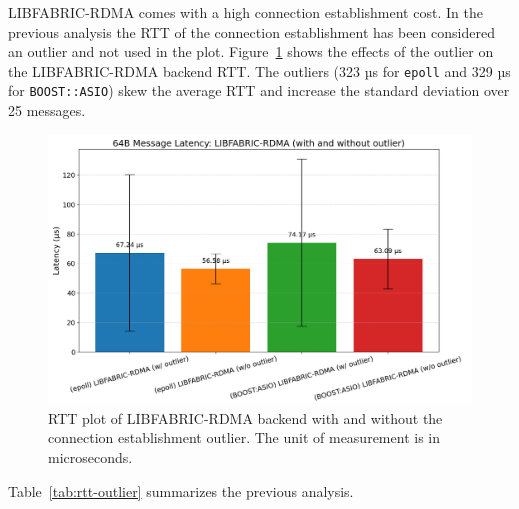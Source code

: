 LIBFABRIC-RDMA comes with a high connection establishment cost. In the previous analysis the \acs{RTT} of the connection establishment has been considered an outlier and not used in the plot. Figure~\ref{fig:rtt-rdma-outlier} shows the effects of the outlier on the LIBFABRIC-RDMA backend \acs{RTT}. The outliers (323 µs for \texttt{epoll} and 329 µs for \texttt{BOOST::ASIO}) skew the average \acs{RTT} and increase the standard deviation over 25 messages.

\begin{figure}[htbp]
\centering
\includegraphics[width=\textwidth]{images/results/rtt-RDMA-outliers.png}
\caption[RDMA RTT plot, with outliers]{RTT plot of LIBFABRIC-RDMA backend with and without the connection establishment outlier. The unit of measurement is in microseconds.}
\label{fig:rtt-rdma-outlier}
\end{figure}

Table~\ref{tab:rtt-outlier} summarizes the previous analysis.

\begin{table}[ht]
\centering
{}
\caption{Effect of outlier on LIBFABRIC-RDMA RTT.}
\label{tab:rtt-outlier}
\end{table}


